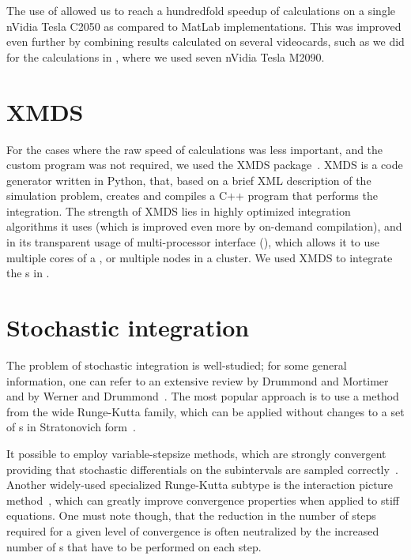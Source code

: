 The use of  allowed us to reach a hundredfold speedup of calculations on a single nVidia Tesla C2050 as compared to MatLab implementations.
This was improved even further by combining results calculated on several videocards, such as we did for the calculations in , where we used seven nVidia Tesla M2090.


\section{XMDS}

For the cases where the raw speed of calculations was less important, and the custom  program was not required, we used the XMDS package~\cite{Collecutt2001,Dennis2013}.
XMDS is a code generator written in Python, that, based on a brief XML description of the simulation problem, creates and compiles a C++ program that performs the integration.
The strength of XMDS lies in highly optimized integration algorithms it uses (which is improved even more by on-demand compilation), and in its transparent usage of multi-processor interface (), which allows it to use multiple cores of a , or multiple nodes in a cluster.
We used XMDS to integrate the s in .


\section{Stochastic integration}

The problem of stochastic integration is well-studied; for some general information, one can refer to an extensive review by Drummond and Mortimer~\cite{Drummond1990} and by Werner and Drummond~\cite{Werner1997}.
The most popular approach is to use a method from the wide Runge-Kutta family, which can be applied without changes to a set of s in Stratonovich form~\cite{Wilkie2004,Wilkie2005}.

It possible to employ variable-stepsize methods, which are strongly convergent providing that stochastic differentials on the subintervals are sampled correctly~\cite{Wilkie2005}.
Another widely-used specialized Runge-Kutta subtype is the  interaction picture method~\cite{CaradocDavies2000}, which can greatly improve convergence properties when applied to stiff equations.
One must note though, that the reduction in the number of steps required for a given level of convergence is often neutralized by the increased number of s that have to be performed on each step.

